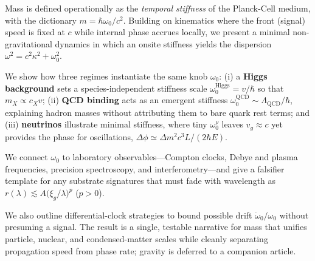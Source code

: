 Mass is defined operationally as the \emph{temporal stiffness} of the Planck-Cell medium, with the dictionary \(m=\hbar\omega_0/c^2\). Building on kinematics where the front (signal) speed is fixed at \(c\) while internal phase accrues locally, we present a minimal non-gravitational dynamics in which an onsite stiffness yields the dispersion \(\omega^2=c^2\kappa^2+\omega_0^2\).

We show how three regimes instantiate the same knob \(\omega_0\): (i) a \textbf{Higgs background} sets a species-independent stiffness scale \(\omega_0^{\mathrm{Higgs}}=v/\hbar\) so that \(m_X\propto c_X v\); (ii) \textbf{QCD binding} acts as an emergent stiffness \(\omega_0^{\mathrm{QCD}}\sim \Lambda_{\mathrm{QCD}}/\hbar\), explaining hadron masses without attributing them to bare quark rest terms; and (iii) \textbf{neutrinos} illustrate minimal stiffness, where tiny \(\omega_0^\nu\) leaves \(v_g\approx c\) yet provides the phase for oscillations, \(\Delta\phi\simeq \Delta m^2 c^3 L/(2\hbar E)\).

We connect \(\omega_0\) to laboratory observables—Compton clocks, Debye and plasma frequencies, precision spectroscopy, and interferometry—and give a falsifier template for any substrate signatures that must fade with wavelength as \(r(\lambda)\lesssim A\big(\xi_g/\lambda\big)^{p}\) (\(p>0\)).

We also outline differential-clock strategies to bound possible drift \(\dot{\omega}_0/\omega_0\) without presuming a signal. The result is a single, testable narrative for mass that unifies particle, nuclear, and condensed-matter scales while cleanly separating propagation speed from phase rate; gravity is deferred to a companion article.
